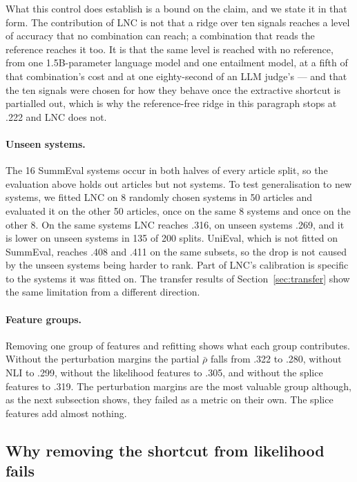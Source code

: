 What this control does establish is a bound on the claim, and we state it in that form. The contribution of LNC is not that a ridge over ten signals reaches a level of accuracy that no combination can reach; a combination that reads the reference reaches it too. It is that the same level is reached with no reference, from one 1.5B-parameter language model and one entailment model, at a fifth of that combination's cost and at one eighty-second of an LLM judge's --- and that the ten signals were chosen for how they behave once the extractive shortcut is partialled out, which is why the reference-free ridge in this paragraph stops at .222 and LNC does not.

\paragraph{Unseen systems.} The 16 SummEval systems occur in both halves of every article split, so the evaluation above holds out articles but not systems. To test generalisation to new systems, we fitted LNC on 8 randomly chosen systems in 50 articles and evaluated it on the other 50 articles, once on the same 8 systems and once on the other 8. On the same systems LNC reaches .316, on unseen systems .269, and it is lower on unseen systems in 135 of 200 splits. UniEval, which is not fitted on SummEval, reaches .408 and .411 on the same subsets, so the drop is not caused by the unseen systems being harder to rank. Part of LNC's calibration is specific to the systems it was fitted on. The transfer results of Section~\ref{sec:transfer} show the same limitation from a different direction.

\paragraph{Feature groups.} Removing one group of features and refitting shows what each group contributes. Without the perturbation margins the partial $\bar\rho$ falls from .322 to .280, without NLI to .299, without the likelihood features to .305, and without the splice features to .319. The perturbation margins are the most valuable group although, as the next subsection shows, they failed as a metric on their own. The splice features add almost nothing.

\subsection{Why removing the shortcut from likelihood fails}


